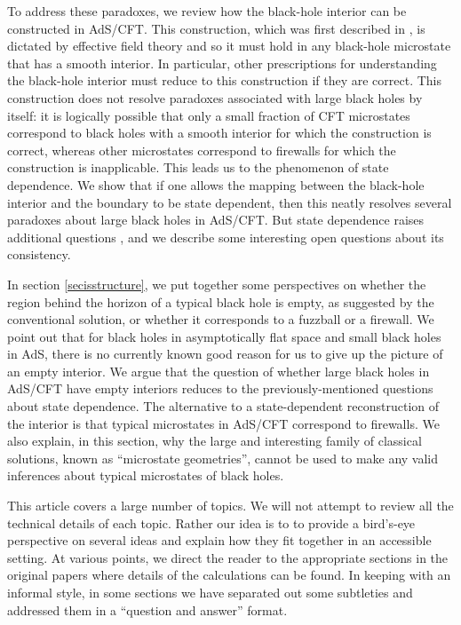\documentclass[12pt]{article}
\begin{document}
To address these paradoxes, we review how the black-hole interior can be constructed in AdS/CFT. This construction, which was first described in \cite{Papadodimas:2013jku}, is dictated by effective field theory and so it must hold in any black-hole microstate that has a smooth interior. In particular, other prescriptions for understanding the black-hole interior must reduce to this construction if they are correct. This construction does not resolve paradoxes associated with large black holes by itself: it is logically possible that only a small fraction of CFT microstates correspond to black holes with a smooth interior for which the construction is correct, whereas other microstates correspond to firewalls for which the construction is inapplicable. This leads us to the phenomenon of state dependence. We show that if one allows the mapping between the black-hole interior and the boundary to be state dependent, then this neatly resolves several paradoxes about large black holes in AdS/CFT. But state dependence raises additional questions \cite{Marolf:2015dia,Raju:2016vsu}, and we describe
some interesting open questions about its consistency.




In section \ref{secisstructure}, we put together some perspectives on whether the region behind the horizon of a typical black hole is empty, as suggested by the conventional solution, or whether it corresponds to a fuzzball or a firewall. We point out that for black holes in asymptotically flat space and small black holes in AdS, there is no currently known good reason for us to give up the picture of an empty interior. We argue that the question of whether large black holes in AdS/CFT have empty interiors reduces to the previously-mentioned questions about state dependence.
The alternative to a state-dependent reconstruction of the interior is that typical microstates in AdS/CFT correspond to firewalls. We also explain, in this section, why the large and interesting family of classical solutions, known as ``microstate geometries'',  cannot be used to make any valid inferences about typical microstates of black holes.

This article covers a large number of topics. We will not attempt to review all the technical details of each topic.
Rather our idea is to to provide a bird's-eye perspective on several ideas and explain how they fit together in an accessible setting. At various points, we direct the reader to the appropriate sections in the original papers where details of the calculations can be found.
 In keeping with an informal style, in some sections we have separated out some subtleties and addressed them in a ``question and answer'' format.
\end{document}
